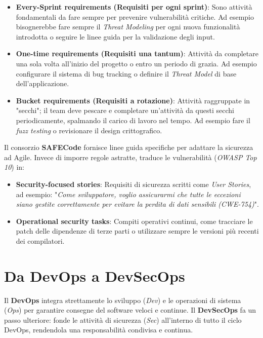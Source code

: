 \begin{itemize}
    \item \textbf{Every-Sprint requirements (Requisiti per ogni sprint)}: Sono attività fondamentali da fare 
    sempre per prevenire vulnerabilità critiche. Ad esempio bisognerebbe fare sempre il 
    \textit{Threat Modeling} per ogni nuova funzionalità introdotta o seguire le linee 
    guida per la validazione degli input.
    \item \textbf{One-time requirements (Requisiti una tantum)}: Attività da completare una sola volta 
    all'inizio del progetto o entro un periodo di grazia. Ad esempio configurare il 
    sistema di bug tracking o definire il \textit{Threat Model} di base dell'applicazione.
    \item \textbf{Bucket requirements (Requisiti a rotazione)}: Attività raggruppate in "secchi"; il team 
    deve pescare e completare un'attività da questi secchi periodicamente, spalmando 
    il carico di lavoro nel tempo. Ad esempio fare il \textit{fuzz testing} o revisionare il 
    design crittografico.
\end{itemize}

Il consorzio \textbf{SAFECode} fornisce linee guida specifiche per adattare la 
sicurezza ad Agile. Invece di imporre regole astratte, traduce le vulnerabilità 
(\textit{OWASP Top 10}) in:

\begin{itemize}
    \item \textbf{Security-focused stories}: Requisiti di sicurezza scritti come 
    \textit{User Stories}, ad esempio: "\textit{Come sviluppatore, voglio assicurarmi 
    che tutte le eccezioni siano gestite correttamente per evitare la perdita di dati 
    sensibili (CWE-754)}".
    \item \textbf{Operational security tasks}: Compiti operativi continui, come 
    tracciare le patch delle dipendenze di terze parti o utilizzare sempre le versioni 
    più recenti dei compilatori.
\end{itemize}

\section{Da DevOps a DevSecOps}

Il \textbf{DevOps} integra strettamente lo sviluppo (\textit{Dev}) e le operazioni di 
sistema (\textit{Ops}) per garantire consegne del software veloci e continue. Il 
\textbf{DevSecOps} fa un passo ulteriore: fonde le attività di sicurezza (\textit{Sec}) 
all'interno di tutto il ciclo DevOps, rendendola una responsabilità condivisa e 
continua.


